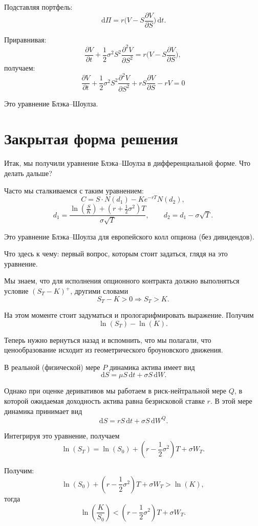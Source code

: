 \documentclass[12pt]{article}
\newcommand{\dd}{\,\mathrm{d}}
\newcommand{\pd}[2]{\frac{\partial #1}{\partial #2}}
\newcommand{\pdd}[2]{\frac{\partial^2 #1}{\partial #2^2}}
\begin{document}
Подставляя портфель:
\[
\dd \Pi = r\bigl(V - S\pd{V}{S}\bigr)\dd t.
\]

Приравнивая:
\[
\pd{V}{t} + \frac{1}{2}\sigma^2 S^2 \pdd{V}{S}
= r\bigl(V - S\pd{V}{S}\bigr),
\]
получаем:
\begin{equation}
\boxed{
\pd{V}{t}
+ \frac{1}{2}\sigma^2 S^2 \pdd{V}{S}
+ rS\pd{V}{S}
- rV = 0
}
\end{equation}

Это уравнение Блэка--Шоулза.

\section{Закрытая форма решения}

Итак, мы получили уравнение Блэка--Шоулза в дифференциальной форме.
Что делать дальше?

Часто мы сталкиваемся с таким уравнением:
\[
C = S\cdot N(d_1) - K e^{-rT} N(d_2),
\]
\[
d_1 = \frac{\ln\left(\frac{S}{K}\right) + \left(r + \frac12\sigma^2\right)T}{\sigma\sqrt{T}},
\qquad
d_2 = d_1 - \sigma\sqrt{T}.
\]

Это уравнение Блэка--Шоулза для европейского
колл опциона (без дивидендов).

Что здесь к чему: первый вопрос, которым стоит задаться,
глядя на это уравнение.

Мы знаем, что для исполнения опционного контракта
должно выполняться условие $(S_T - K)^+$, другими словами
\begin{equation}
S_T - K > 0 \Rightarrow S_T > K.
\end{equation}

На этом моменте стоит задуматься и прологарифмировать выражение.
Получим
\[
\ln(S_T) - \ln(K).
\]

Теперь нужно вернуться назад и вспомнить,
что мы полагали, что ценообразование исходит
из геометрического броуновского движения.

В реальной (физической) мере $P$ динамика актива имеет вид
\[
\dd S = \mu S \dd t + \sigma S \dd W.
\]

Однако при оценке деривативов мы работаем
в риск-нейтральной мере $Q$, в которой ожидаемая
доходность актива равна безрисковой ставке $r$.
В этой мере динамика принимает вид
\[
\dd S = r S \dd t + \sigma S \dd W^Q.
\]

Интегрируя это уравнение, получаем
\[
\ln(S_T) = \ln(S_0) + \left(r - \frac12\sigma^2\right)T + \sigma W_T.
\]

Получим:
\[
\ln(S_0) + \left(r - \frac12\sigma^2\right)T + \sigma W_T > \ln(K),
\]
тогда
\[
\ln\left(\frac{K}{S_0}\right)
<
\left(r - \frac12\sigma^2\right)T + \sigma W_T.
\]
\end{document}
